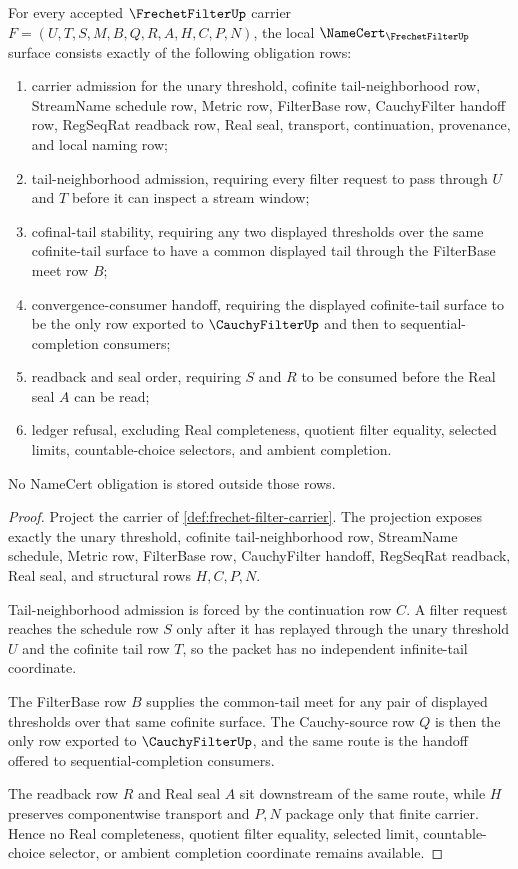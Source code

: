 \begin{theorem}
\label{thm:frechet-filter-namecert-obligations}
For every accepted $\FrechetFilterUp$ carrier $F=(U,T,S,M,B,Q,R,A,H,C,P,N)$, the local $\NameCert_{\FrechetFilterUp}$ surface consists exactly of the following obligation rows:
\begin{enumerate}
\item carrier admission for the unary threshold, cofinite tail-neighborhood row, StreamName schedule row, Metric row, FilterBase row, CauchyFilter handoff row, RegSeqRat readback row, Real seal, transport, continuation, provenance, and local naming row;
\item tail-neighborhood admission, requiring every filter request to pass through $U$ and $T$ before it can inspect a stream window;
\item cofinal-tail stability, requiring any two displayed thresholds over the same cofinite-tail surface to have a common displayed tail through the FilterBase meet row $B$;
\item convergence-consumer handoff, requiring the displayed cofinite-tail surface to be the only row exported to $\CauchyFilterUp$ and then to sequential-completion consumers;
\item readback and seal order, requiring $S$ and $R$ to be consumed before the Real seal $A$ can be read;
\item ledger refusal, excluding Real completeness, quotient filter equality, selected limits, countable-choice selectors, and ambient completion.
\end{enumerate}
No NameCert obligation is stored outside those rows.
\end{theorem}
\begin{proof}
Project the carrier of \autoref{def:frechet-filter-carrier}. The projection exposes exactly the unary threshold, cofinite tail-neighborhood row, StreamName schedule, Metric row, FilterBase row, CauchyFilter handoff, RegSeqRat readback, Real seal, and structural rows $H,C,P,N$.

Tail-neighborhood admission is forced by the continuation row $C$. A filter request reaches the schedule row $S$ only after it has replayed through the unary threshold $U$ and the cofinite tail row $T$, so the packet has no independent infinite-tail coordinate.

The FilterBase row $B$ supplies the common-tail meet for any pair of displayed thresholds over that same cofinite surface. The Cauchy-source row $Q$ is then the only row exported to $\CauchyFilterUp$, and the same route is the handoff offered to sequential-completion consumers.

The readback row $R$ and Real seal $A$ sit downstream of the same route, while $H$ preserves componentwise transport and $P,N$ package only that finite carrier. Hence no Real completeness, quotient filter equality, selected limit, countable-choice selector, or ambient completion coordinate remains available.
\end{proof}

